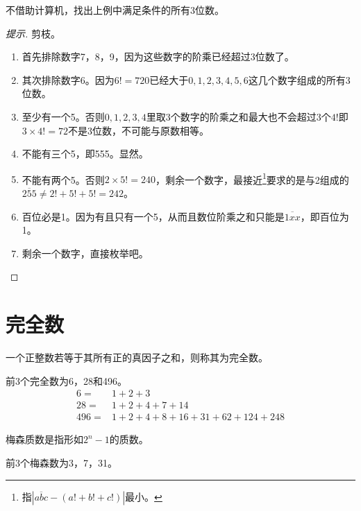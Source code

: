 \begin{question}[莫斯科，1940]
  不借助计算机，找出上例中满足条件的所有3位数。
\end{question}
\begin{proof}[提示]
  剪枝。
  \begin{enumerate}
  \item 首先排除数字7，8，9，因为这些数字的阶乘已经超过3位数了。

  \item 其次排除数字6。因为$6!=720$已经大于$0,1,2,3,4,5,6$这几个数字组成的所有3位数。

  \item 至少有一个5。否则$0,1,2,3,4$里取3个数字的阶乘之和最大也不会超过3个$4!$即$3\times 4!=72$不是3位数，不可能与原数相等。

  \item 不能有三个5，即555。显然。

  \item 不能有两个5。否则$2\times 5!=240$，剩余一个数字，最接近\footnote{指$|\overline{abc}-(a!+b!+c!)|$最小。}要求的是与2组成的$\overline{255}\ne 2!+5!+5!=242$。

  \item 百位必是1。因为有且只有一个5，从而且数位阶乘之和只能是$\overline{1xx}$，即百位为1。
    
  \item 剩余一个数字，直接枚举吧。\qedhere
  \end{enumerate}
\end{proof}


\section{完全数}
\label{sec:perfect-number}

\begin{definition}
  一个正整数若等于其所有正的真因子之和，则称其为完全数。
\end{definition}
前3个完全数为6，28和496。
\begin{align*}
  6   ={} & 1 + 2 + 3\\
  28  ={} & 1 + 2 + 4 + 7 + 14\\
  496 ={} & 1 + 2 + 4 + 8 + 16 + 31 + 62 + 124 + 248
\end{align*}

\begin{definition}
  梅森质数是指形如$2^n - 1$的质数。
\end{definition}

前3个梅森数为3，7，31。


